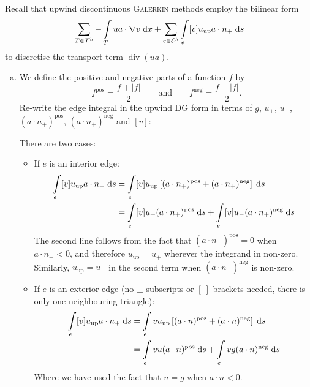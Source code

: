Recall that upwind discontinuous \textsc{Galerkin} methods employ the bilinear form
\begin{equation*}
\sum_{T\in\mathcal{T}^h} -\int\limits_T ua \cdot \nabla v \;\mathrm{d}x + \sum_{e\in\mathcal{E}^h} \int\limits_e [v] u_{\text{up}} a \cdot n_+ \;\mathrm{d}s
\end{equation*}
to discretise the transport term $\operatorname{div} (ua)$.
\begin{enumerate}[(a)]
\item We define the positive and negative parts of a function $f$ by
\begin{equation*}
f^{\text{pos}} = \frac{f + \lvert f \rvert}{2} \qquad \text{and} \qquad f^{\text{neg}} = \frac{f - \lvert f \rvert}{2}.
\end{equation*}
Re-write the edge integral in the upwind DG form in terms of $g$, $u_+$, $u_-$, $(a\cdot n_+)^{\text{pos}}$, $(a\cdot n_+)^{\text{neg}}$ and $[v]$:

\vspace{0.5cm}
\begin{solution}
There are two cases:
\begin{itemize}
\item If $e$ is an interior edge:
\begin{align*}
\int\limits_e [v] u_{\text{up}} a \cdot n_+ \;\mathrm{d}s
&= \int\limits_e [v] u_{\text{up}} \left[ (a\cdot n_+)^{\text{pos}} + (a\cdot n_+)^{\text{neg}} \right] \;\mathrm{d}s \\
&= \int\limits_e [v] u_+ (a\cdot n_+)^{\text{pos}} \;\mathrm{d}s + \int\limits_e [v] u_- (a\cdot n_+)^{\text{neg}} \;\mathrm{d}s
\end{align*}
The second line follows from the fact that $(a\cdot n_+)^{\text{pos}} = 0$ when $a\cdot n_+ < 0$, and therefore $u_{\text{up}} = u_+$ wherever the integrand in non-zero. Similarly, $u_{\text{up}} = u_-$ in the second term when $(a\cdot n_+)^{\text{neg}}$ is non-zero.
\vfill
\item If $e$ is an exterior edge (no $\pm$ subscripts or $[\:]$ brackets needed, there is only one neighbouring triangle):
\begin{align*}
\int\limits_e [v] u_{\text{up}} a \cdot n_+ \;\mathrm{d}s
&= \int\limits_e v u_{\text{up}} \left[ (a\cdot n)^{\text{pos}} + (a\cdot n)^{\text{neg}} \right] \;\mathrm{d}s \\
&= \int\limits_e v u (a\cdot n)^{\text{pos}} \;\mathrm{d}s + \int\limits_e v g (a\cdot n)^{\text{neg}} \;\mathrm{d}s
\end{align*}
Where we have used the fact that $u=g$ when $a\cdot n < 0$.
\end{itemize}
\end{solution}


\end{enumerate}
